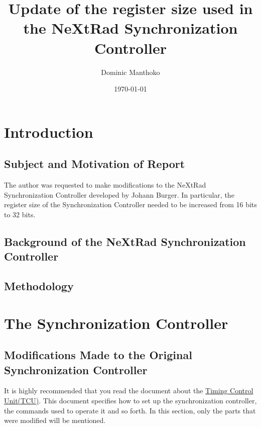 \documentclass[12pt, a4paper]{article}
\title{Update of the register size used in the NeXtRad Synchronization Controller}
\author{Dominic Manthoko}
\date{\today}
\begin{document}
\maketitle

\sloppy


\section{Introduction}

\subsection{Subject and Motivation of Report}
The author was requested to make modifications to the NeXtRad Synchronization Controller developed by Johann Burger. In particular, the register size of the Synchronization Controller needed to be increased from 16 bits to 32 bits. 

\subsection{Background of the NeXtRad Synchronization Controller}


\subsection{Methodology}

\section{The Synchronization Controller}
\subsection{Modifications Made to the Original Synchronization Controller}
It is highly recommended that you read the document about the \href{https://docs.google.com/document/d/1E-mxDRlNcjSsjckUj8SuQOPBRs8Zv4AUUxXzLDHU3zc/edit?usp=sharing}{Timing Control Unit(TCU)}. This document specifies how to set up the synchronization controller, the commands used to operate it and so forth. In this section, only the parts that were modified will be mentioned.

\begin{flushleft}

\end{flushleft}
\end{document}
